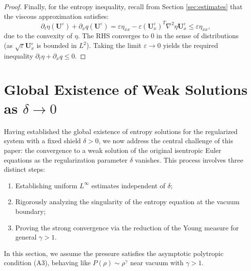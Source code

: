 \documentclass[12pt, reqno]{article}
\theoremstyle{definition}
\numberwithin{equation}{section}
\begin{document}
\begin{proof}
Finally, for the entropy inequality, recall from Section \ref{sec:estimates} that the viscous approximation satisfies:
\[
\partial_t \eta(\mathbf{U}^\varepsilon) + \partial_x q(\mathbf{U}^\varepsilon) = \varepsilon \eta_{xx} - \varepsilon (\mathbf{U}^\varepsilon_x)^T \nabla^2 \eta \mathbf{U}^\varepsilon_x \le \varepsilon \eta_{xx},
\]
due to the convexity of $\eta$. The RHS converges to 0 in the sense of distributions (as $\sqrt{\varepsilon} \mathbf{U}_x^\varepsilon$ is bounded in $L^2$). Taking the limit $\varepsilon \to 0$ yields the required inequality $\partial_t \eta + \partial_x q \le 0$.
\end{proof}

\section{Global Existence of Weak Solutions as \texorpdfstring{$\delta \to 0$}{delta to 0}}
\label{sec:vanishing_delta}

Having established the global existence of entropy solutions for the regularized system with a fixed shield $\delta > 0$, we now address the central challenge of this paper: the convergence to a weak solution of the original isentropic Euler equations as the regularization parameter $\delta$ vanishes. This process involves three distinct steps:
\begin{enumerate}
    \item Establishing uniform $L^\infty$ estimates independent of $\delta$;
    \item Rigorously analyzing the singularity of the entropy equation at the vacuum boundary;
    \item Proving the strong convergence via the reduction of the Young measure for general $\gamma > 1$.
\end{enumerate}

In this section, we assume the pressure satisfies the asymptotic polytropic condition (A3), behaving like $P(\rho) \sim \rho^\gamma$ near vacuum with $\gamma > 1$.
\end{document}

